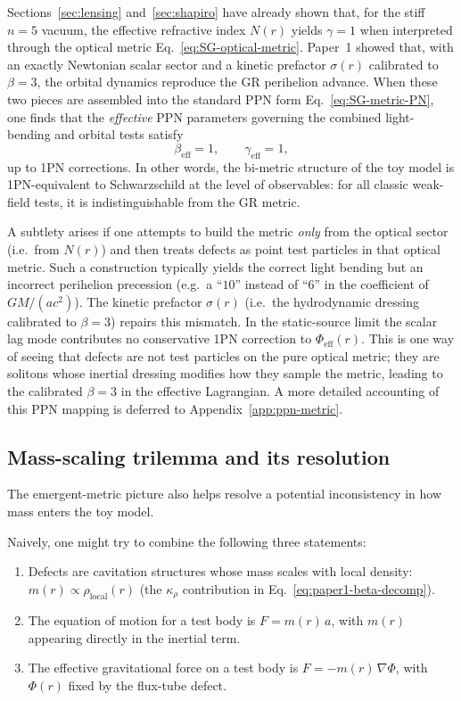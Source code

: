 \documentclass[11pt]{article}
\begin{document}
Sections~\ref{sec:lensing} and~\ref{sec:shapiro} have already shown that,
for the stiff $n=5$ vacuum, the effective refractive index $N(r)$ yields
$\gamma = 1$ when interpreted through the optical metric
Eq.~\eqref{eq:SG-optical-metric}.
Paper~1 showed that, with an exactly Newtonian scalar sector and a kinetic
prefactor $\sigma(r)$ calibrated to $\beta=3$, the orbital dynamics
reproduce the GR perihelion advance.
When these two pieces are assembled into the standard PPN form
Eq.~\eqref{eq:SG-metric-PN}, one finds that the \emph{effective} PPN
parameters governing the combined light-bending and orbital tests satisfy
\begin{equation}
  \beta_{\text{eff}} = 1,
  \qquad
  \gamma_{\text{eff}} = 1,
\end{equation}
up to 1PN corrections.
In other words, the bi-metric structure of the toy model is 1PN-equivalent
to Schwarzschild at the level of observables: for all classic weak-field
tests, it is indistinguishable from the GR metric.

A subtlety arises if one attempts to build the metric \emph{only} from the
optical sector (i.e.\ from $N(r)$) and then treats defects as point test
particles in that optical metric.
Such a construction typically yields the correct light bending but an
incorrect perihelion precession (e.g.\ a ``$10$'' instead of ``$6$'' in the
coefficient of $GM/(a c^2)$).
The kinetic prefactor $\sigma(r)$ (i.e.\ the hydrodynamic dressing calibrated
to $\beta=3$) repairs this mismatch.  In the static-source limit the scalar lag
mode contributes no conservative 1PN correction to $\Phi_{\mathrm{eff}}(r)$.
This is one way of seeing that defects are not test particles on the pure
optical metric; they are solitons whose inertial dressing modifies how they
sample the metric, leading to the calibrated $\beta=3$ in the effective
Lagrangian.
A more detailed accounting of this PPN mapping is deferred to
Appendix~\ref{app:ppn-metric}.


\subsection{Mass-scaling trilemma and its resolution}
\label{subsec:trilemma}

The emergent-metric picture also helps resolve a potential inconsistency in
how mass enters the toy model.

Naively, one might try to combine the following three statements:

\begin{enumerate}
  \item Defects are cavitation structures whose mass scales with local
        density: $m(r) \propto \rho_{\text{local}}(r)$ (the $\kappa_\rho$
        contribution in Eq.~\eqref{eq:paper1-beta-decomp}).
  \item The equation of motion for a test body is $F = m(r)\,a$, with
        $m(r)$ appearing directly in the inertial term.
  \item The effective gravitational force on a test body is
        $F = -m(r)\,\nabla\Phi$, with $\Phi(r)$ fixed by the flux-tube
        defect.
\end{enumerate}
\end{document}
